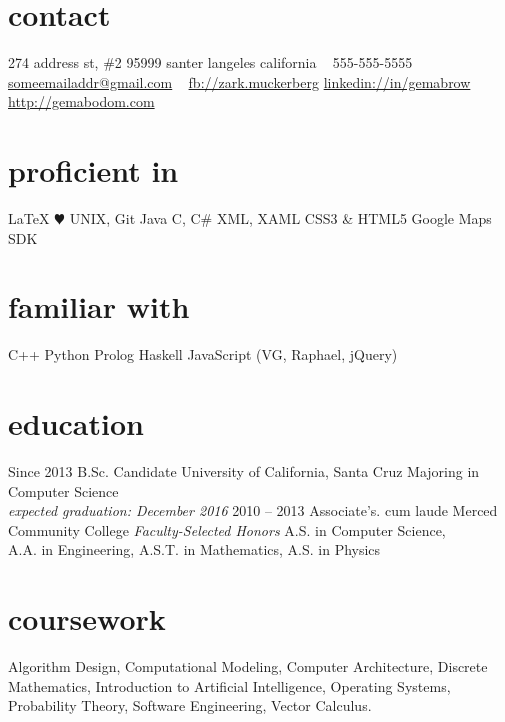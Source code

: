 \documentclass[]{./friggeri-cv}
\begin{document}
       {%
         }


\begin{aside}
  \section{contact}
    274 address st, \#2
    95999 santer langeles 
    california
    ~
    {555-555-5555} 
    \linespread{1.5}\href{mailto:someemailaddr@gmail.com}{someemailaddr@gmail.com}
    ~
    \linespread{1.5}\href{https://www.facebook.com/zark.muckerberg}{fb://zark.muckerberg} 
    \linespread{1.5}\href{http://linkedin.com/in/gemabrow}{linkedin://in/gemabrow}
    \linespread{1.5}\href{http://www.gemabodom.com}{http://gemabodom.com}
  \section{proficient in}
    \LaTeX
   {\color{red} $\varheartsuit$} %
    UNIX, Git
    Java
    C, C\#
    XML, XAML
    CSS3 \& HTML5
    Google Maps SDK
 \section{familiar with}
    C++
    Python
    Prolog
    Haskell
    JavaScript
    (VG, Raphael, jQuery)
\end{aside}
\section{education}
\begin{entrylist}
  \entry
    {Since 2013}
    {B.Sc. {\normalfont Candidate}}
    {University of California, Santa Cruz}
    {Majoring in Computer Science\\\emph{expected graduation: December 2016}}
  \entry
    {2010 – 2013}
    {Associate's. cum laude}
    {Merced Community College}
    {\emph{Faculty-Selected Honors} A.S. in Computer Science,
    \\A.A. in Engineering, A.S.T. in Mathematics, A.S. in Physics}
\end{entrylist}
\section{coursework}
Algorithm Design, %
Computational Modeling, %
Computer Architecture, %
Discrete Mathematics, %
Introduction to Artificial Intelligence, %
Operating Systems, %
Probability Theory, %
Software Engineering, %
Vector Calculus. %
\end{document}
